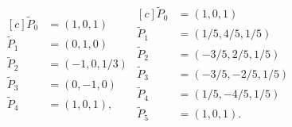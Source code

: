 \documentclass[a4paper,12pt]{article}
\begin{document}
\begin{equation*}
\begin{aligned}[c]
\tilde{P}_0 &= (1,0, 1)\\
\tilde{P}_1 &= (0, 1, 0)\\
\tilde{P}_2 &= (-1, 0, 1/3)\\
\tilde{P}_3 &= (0, -1, 0)\\
\tilde{P}_4 &= (1, 0, 1), \\
\end{aligned}
\begin{aligned}[c]
\tilde{P}_0 &= (1,0, 1)\\
\tilde{P}_1 &= (1/5, 4/5, 1/5)\\
\tilde{P}_2 &= (-3/5, 2/5, 1/5)\\
\tilde{P}_3 &= (-3/5, -2/5, 1/5)\\
\tilde{P}_4 &= (1/5, -4/5, 1/5)\\
\tilde{P}_5 &= (1, 0, 1). \\
\end{aligned}
\end{equation*}
\end{document}
